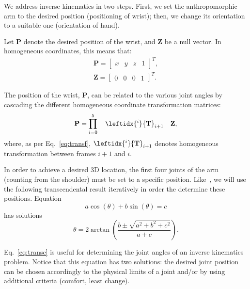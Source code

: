 We address inverse kinematics in two steps. First, we set the anthropomorphic arm to the desired position (positioning of wrist); then, we change its orientation to a suitable one (orientation of hand).

Let $\mathbf{P}$ denote the desired position of the wrist, and $\mathbf{Z}$ be a null vector. In homogeneous coordinates, this means that:
%
\begin{gather}
\mathbf{P} = \begin{bmatrix} x & y & z & 1 \end{bmatrix}^T, \\
\mathbf{Z} = \begin{bmatrix} 0 & 0 & 0 & 1 \end{bmatrix}^T.
\end{gather}

The position of the wrist, $\mathbf{P}$, can be related to the various joint angles by cascading the different homogeneous coordinate transformation matrices:
%
\begin{equation}\label{eq:wrist_pos}
\mathbf{P} = \prod_{i=0}^5 \quad \leftidx{^i}{\mathbf{T}}_{i+1} \quad \mathbf{Z},
\end{equation}
%
where, as per Eq.~\ref{eq:transf}, $\leftidx{^i}{\mathbf{T}}_{i+1}$ denotes homogeneous transformation between frames $i+1$ and $i$.

In order to achieve a desired 3D location, the first four joints of the arm (counting from the shoulder) must be set to a specific position. Like~\cite{lopes:2004}, we will use the following transcendental result iteratively in order the determine these positions. Equation
%
\begin{equation}
a \cos(\theta) + b \sin(\theta) = c 
\end{equation}
%
has solutions
%
\begin{equation}\label{eq:transc}
\theta = 2 \arctan \left( \frac{b \pm \sqrt{a^2+b^2+c^2}}{a+c} \right).
\end{equation}

Eq.~\ref{eq:transc} is useful for determining the joint angles of an inverse kinematics problem. Notice that this equation has two solutions: the desired joint position can be chosen accordingly to the physical limits of a joint and/or by using additional criteria (comfort, least change).

